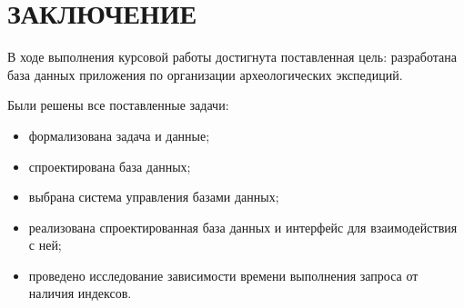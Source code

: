 \section*{ЗАКЛЮЧЕНИЕ}

В ходе выполнения курсовой работы достигнута поставленная цель: разработана база данных приложения по организации археологических экспедиций. 

Были решены все поставленные задачи:
\begin{itemize}[left=0.49cm, label*=---]
	\item формализована задача и данные;
	\item спроектирована база данных;
	\item выбрана система управления базами данных;
	\item реализована спроектированная база данных и интерфейс для взаимодействия с ней;
	\item проведено исследование зависимости времени выполнения запроса от наличия индексов.
\end{itemize}

